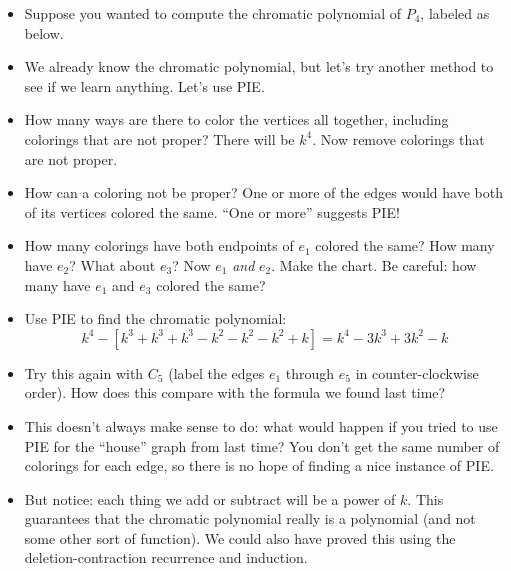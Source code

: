 \documentclass[12pt]{article}
\theoremstyle{plain}
\theoremstyle{definition}
\theoremstyle{remark}
\newcommand{\vtx}[2]{node[fill,circle,inner sep=0pt, minimum size=4pt,label=#1:#2]{}}
\newcommand{\vb}[1]{\vtx{below}{#1}}
\begin{document}
\begin{itemize}
  \item Suppose you wanted to compute the chromatic polynomial of $P_4$, labeled as below.

  \begin{center}
    {\footnotesize
    }
  \end{center}

  \item We already know the chromatic polynomial, but let's try another method to see if we learn anything.  Let's use PIE.

  \item How many ways are there to color the vertices all together, including colorings that are not proper?  There will be $k^4$.  Now remove colorings that are not proper.

  \item How can a coloring not be proper?  One or more of the edges would have both of its vertices colored the same.  ``One or more'' suggests PIE!

  \item How many colorings have both endpoints of $e_1$ colored the same?  How many have $e_2$?  What about $e_3$?  Now $e_1$ \emph{and} $e_2$.  Make the chart.  Be careful: how many have $e_1$ and $e_3$ colored the same?

  \item Use PIE to find the chromatic polynomial:
  \[k^4 - \left[k^3 + k^3 + k^3 - k^2 - k^2 - k^2 + k\right] = k^4 - 3k^3 + 3k^2 - k\]

  \item Try this again with $C_5$ (label the edges $e_1$ through $e_5$ in counter-clockwise order).  How does this compare with the formula we found last time?

  \item This doesn't always make sense to do: what would happen if you tried to use PIE for the ``house'' graph from last time?  You don't get the same number of colorings for each edge, so there is no hope of finding a nice instance of PIE.

  \item But notice: each thing we add or subtract will be a power of $k$.  This guarantees that the chromatic polynomial really is a polynomial (and not some other sort of function).  We could also have proved this using the deletion-contraction recurrence and induction.


\end{itemize}
\end{document}
